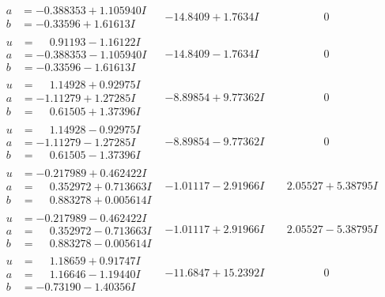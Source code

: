 \documentclass[1p]{elsarticle_modified}
\theoremstyle{definition}
\begin{document}
$$\begin{array}{c|c|c}
\begin{aligned}
a &= -0.388353 + 1.105940 I \\
b &= -0.33596 + 1.61613 I\end{aligned}
 & -14.8409 + 1.7634 I & \phantom{-0.000000 } 0 \\ \hline\begin{aligned}
u &= \phantom{-}0.91193 - 1.16122 I \\
a &= -0.388353 - 1.105940 I \\
b &= -0.33596 - 1.61613 I\end{aligned}
 & -14.8409 - 1.7634 I & \phantom{-0.000000 } 0 \\ \hline\begin{aligned}
u &= \phantom{-}1.14928 + 0.92975 I \\
a &= -1.11279 + 1.27285 I \\
b &= \phantom{-}0.61505 + 1.37396 I\end{aligned}
 & -8.89854 + 9.77362 I & \phantom{-0.000000 } 0 \\ \hline\begin{aligned}
u &= \phantom{-}1.14928 - 0.92975 I \\
a &= -1.11279 - 1.27285 I \\
b &= \phantom{-}0.61505 - 1.37396 I\end{aligned}
 & -8.89854 - 9.77362 I & \phantom{-0.000000 } 0 \\ \hline\begin{aligned}
u &= -0.217989 + 0.462422 I \\
a &= \phantom{-}0.352972 + 0.713663 I \\
b &= \phantom{-}0.883278 + 0.005614 I\end{aligned}
 & -1.01117 - 2.91966 I & \phantom{-}2.05527 + 5.38795 I \\ \hline\begin{aligned}
u &= -0.217989 - 0.462422 I \\
a &= \phantom{-}0.352972 - 0.713663 I \\
b &= \phantom{-}0.883278 - 0.005614 I\end{aligned}
 & -1.01117 + 2.91966 I & \phantom{-}2.05527 - 5.38795 I \\ \hline\begin{aligned}
u &= \phantom{-}1.18659 + 0.91747 I \\
a &= \phantom{-}1.16646 - 1.19440 I \\
b &= -0.73190 - 1.40356 I\end{aligned}
 & -11.6847 + 15.2392 I & \phantom{-0.000000 } 0\\

\end{array}$$
\end{document}
